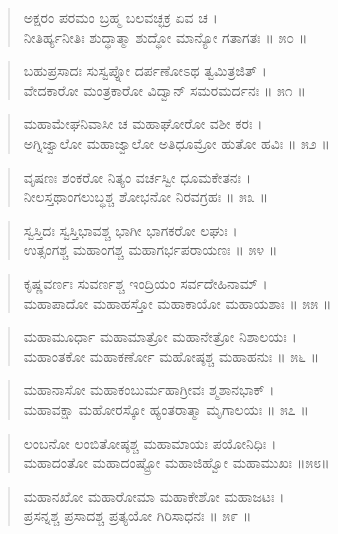 \begin{verse}
ಅಕ್ಷರಂ ಪರಮಂ ಬ್ರಹ್ಮ ಬಲವಚ್ಛಕ್ರ ಏವ ಚ ।\\ನೀತಿರ್ಹ್ಯನೀತಿಃ ಶುದ್ಧಾತ್ಮಾ ಶುದ್ಧೋ ಮಾನ್ಯೋ ಗತಾಗತಃ \num{॥ ೫೦ ॥}
\end{verse}

\begin{verse}
ಬಹುಪ್ರಸಾದಃ ಸುಸ್ವಪ್ನೋ ದರ್ಪಣೋಽಥ ತ್ವಮಿತ್ರಜಿತ್ ।\\ವೇದಕಾರೋ ಮಂತ್ರಕಾರೋ ವಿದ್ವಾನ್ ಸಮರಮರ್ದನಃ \num{॥ ೫೧ ॥}
\end{verse}

\begin{verse}
ಮಹಾಮೇಘನಿವಾಸೀ ಚ ಮಹಾಘೋರೋ ವಶೀ ಕರಃ ।\\ಅಗ್ನಿಜ್ವಾಲೋ ಮಹಾಜ್ವಾಲೋ ಅತಿಧೂಮ್ರೋ ಹುತೋ ಹವಿಃ \num{॥ ೫೨ ॥}
\end{verse}

\begin{verse}
ವೃಷಣಃ ಶಂಕರೋ ನಿತ್ಯಂ ವರ್ಚಸ್ವೀ ಧೂಮಕೇತನಃ ।\\ನೀಲಸ್ತಥಾಂಗಲುಬ್ಧಶ್ಚ ಶೋಭನೋ ನಿರವಗ್ರಹಃ \num{॥ ೫೩ ॥}
\end{verse}

\begin{verse}
ಸ್ವಸ್ತಿದಃ ಸ್ವಸ್ತಿಭಾವಶ್ಚ ಭಾಗೀ ಭಾಗಕರೋ ಲಘುಃ ।\\ಉತ್ಸಂಗಶ್ಚ ಮಹಾಂಗಶ್ಚ ಮಹಾಗರ್ಭಪರಾಯಣಃ \num{॥ ೫೪ ॥}
\end{verse}

\begin{verse}
ಕೃಷ್ಣವರ್ಣಃ ಸುವರ್ಣಶ್ಚ ಇಂದ್ರಿಯಂ ಸರ್ವದೇಹಿನಾಮ್ ।\\ಮಹಾಪಾದೋ ಮಹಾಹಸ್ತೋ ಮಹಾಕಾಯೋ ಮಹಾಯಶಾಃ \num{॥ ೫೫ ॥}
\end{verse}

\begin{verse}
ಮಹಾಮೂರ್ಧಾ ಮಹಾಮಾತ್ರೋ ಮಹಾನೇತ್ರೋ ನಿಶಾಲಯಃ ।\\ಮಹಾಂತಕೋ ಮಹಾಕರ್ಣೋ ಮಹೋಷ್ಠಶ್ಚ ಮಹಾಹನುಃ \num{॥ ೫೬ ॥}
\end{verse}

\begin{verse}
ಮಹಾನಾಸೋ ಮಹಾಕಂಬುರ್ಮಹಾಗ್ರೀವಃ ಶ್ಮಶಾನಭಾಕ್ ।\\ಮಹಾವಕ್ಷಾ ಮಹೋರಸ್ಕೋ ಹ್ಯಂತರಾತ್ಮಾ ಮೃಗಾಲಯಃ \num{॥ ೫೭ ॥}
\end{verse}

\begin{verse}
ಲಂಬನೋ ಲಂಬಿತೋಷ್ಠಶ್ಚ ಮಹಾಮಾಯಃ ಪಯೋನಿಧಿಃ ।\\ಮಹಾದಂತೋ ಮಹಾದಂಷ್ಟ್ರೋ ಮಹಾಜಿಹ್ವೋ ಮಹಾಮುಖಃ \num{॥೫೮॥}
\end{verse}

\begin{verse}
ಮಹಾನಖೋ ಮಹಾರೋಮಾ ಮಹಾಕೇಶೋ ಮಹಾಜಟಃ ।\\ಪ್ರಸನ್ನಶ್ಚ ಪ್ರಸಾದಶ್ಚ ಪ್ರತ್ಯಯೋ ಗಿರಿಸಾಧನಃ \num{॥ ೫೯ ॥}
\end{verse}

